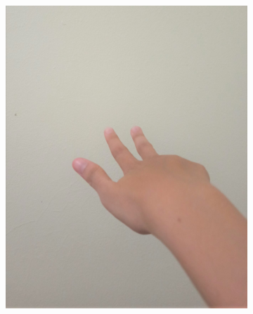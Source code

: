 \documentclass[conference]{IEEEtran}
\begin{document}
\begin{figure} [h]
\begin{center}
\begin{subfigure}[t]{0.11\textwidth}
			\includegraphics[width=\textwidth]{img/pola3c.jpg}
			\caption{\label{fig:gs3c}}
		\end{subfigure}
		\hspace{0.1em}
		\begin{subfigure}[t]{0.11\textwidth}

\end{subfigure}
\end{center}
\end{figure}
\end{document}

